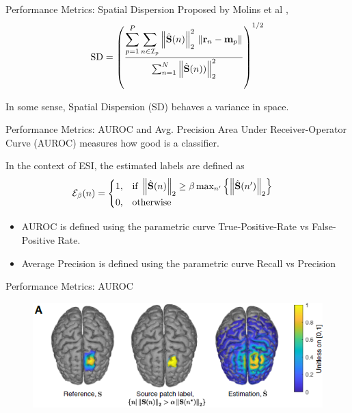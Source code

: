 \documentclass[progressbar=head]{beamer}
\begin{document}
\begin{frame}{Performance Metrics: Spatial Dispersion}
Proposed by Molins et al , 
\begin{equation}
\text{SD}
=
\left( 
\frac{ \displaystyle
\sum_{p=1}^P \sum_{n\in \mathcal{I}_p} \left\lVert \hat{\mathbf{S}}(n) \right\rVert_2^2\, \left\lVert \mathbf{r}_n-\mathbf{m}_p \right\rVert }{\sum_{n=1}^N \left\lVert \hat{\mathbf{S}}(n)) \right\rVert_2^2}
 \right)^{1/2}
\end{equation}

In some sense, Spatial Dispersion (SD) behaves a variance in space.
\end{frame}

\begin{frame}{Performance Metrics: AUROC and Avg. Precision}
Area Under Receiver-Operator Curve (AUROC) measures how good is a classifier.

In the context of ESI, the estimated labels are defined as
\begin{align}
\mathcal{E}_\beta(n)
&=
\begin{cases}
1, &\text{if }
\left\lVert \hat{\mathbf{S}}(n) \right\rVert_2 \geq \beta \max_{n'}\left\{ \left\lVert \hat{\mathbf{S}}(n') \right\rVert_2 \right\}
\\
0, &\text{otherwise}
\end{cases}
\end{align}

\begin{itemize}
\item AUROC is defined using the parametric curve True-Positive-Rate vs False-Positive Rate.
\item Average Precision is defined using the parametric curve Recall vs Precision
\end{itemize}

\end{frame}

\begin{frame}{Performance Metrics: AUROC}
\begin{figure}
\centering
\includegraphics[width=0.8\linewidth]{./img_dev3/auroc1}
\end{figure}
\end{frame}
\end{document}
